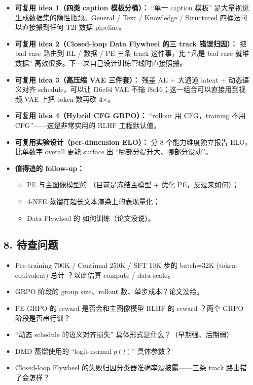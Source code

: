 \begin{itemize}[leftmargin=1.5em]
  \item \textbf{可复用 idea 1（四类 caption 模板分桶）：} ``单一 caption 模板'' 是大量视觉生成数据集的隐性瓶颈。General / Text / Knowledge / Structured 四桶法可以直接搬到任何 T2I 数据 pipeline。
  \item \textbf{可复用 idea 2（Closed-loop Data Flywheel 的三 track 错误归因）：} 把 bad case 路由到 RL / 数据 / PE 三条 track 这件事，比 ``凡是 bad case 就堆数据'' 高效很多。下一次自己设计训练管线时直接照搬。
  \item \textbf{可复用 idea 3（高压缩 VAE 三件套）：} 残差 AE + 大通道 latent + 动态语义对齐 schedule，可以让 f16c64 VAE 不输 f8c16；这一组合可以直接用到视频 VAE 上把 token 数再砍 4$\times$。
  \item \textbf{可复用 idea 4（Hybrid CFG GRPO）：} ``rollout 用 CFG，training 不用 CFG''——这是非常实用的 RLHF 工程默认值。
  \item \textbf{可复用实验设计（per-dimension ELO）：} 分 8 个能力维度独立报告 ELO，比单数字 overall 更能 surface 出 ``哪部分提升大、哪部分没动''。
  \item \textbf{值得追的 follow-up：}
    \begin{itemize}[leftmargin=1.5em]
      \item PE 与主图像模型的 （目前是冻结主模型 + 优化 PE，反过来如何）；
      \item 4-NFE 蒸馏在超长文本渲染上的表现量化；
      \item Data Flywheel 的  如何训练（论文没说）。
    \end{itemize}
\end{itemize}

\subsection{8. 待查问题}

\begin{itemize}[leftmargin=1.5em]
  \item Pre-training 700K / Continual 250K / SFT 10K 步的 batch=32K (token-equivalent) 总计 ？以此估算 compute / data scale。
  \item GRPO 阶段的 group size、rollout 数、单步成本？论文没给。
  \item PE GRPO 的 reward 是否会和主图像模型 RLHF 的 reward ？两个 GRPO 阶段是否串行训？
  \item ``动态 schedule 的语义对齐损失'' 具体形式是什么？（早期强、后期弱）
  \item DMD 蒸馏使用的 ``logit-normal $p(t)$'' 具体参数？
  \item Closed-loop Flywheel 的失败归因分类器准确率没披露——三条 track 路由错了会怎样？
\end{itemize}

